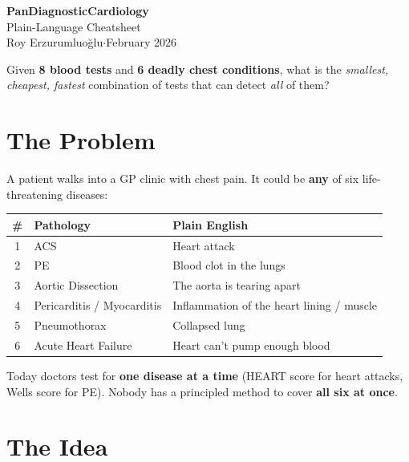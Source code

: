 \documentclass[11pt,a4paper]{article}
\begin{document}
\begin{center}
{\LARGE\bfseries\color{accent} PanDiagnosticCardiology}\\[4pt]
{\Large Plain-Language Cheatsheet}\\[6pt]
{\normalsize Roy Erzurumluo\u{g}lu\quad$\cdot$\quad February 2026}
\end{center}

\begin{tcolorbox}[insightbox, title={The Paper in One Sentence}]
Given \textbf{8 blood tests} and \textbf{6 deadly chest conditions}, what is the
\emph{smallest, cheapest, fastest} combination of tests that can detect
\emph{all} of them?
\end{tcolorbox}

\section{The Problem}

A patient walks into a GP clinic with chest pain. It could be \textbf{any} of
six life-threatening diseases:

\begin{table}[h]
\centering\small
\begin{tabular}{@{}clp{7.5cm}@{}}
\toprule
\textbf{\#} & \textbf{Pathology} & \textbf{Plain English} \\
\midrule
1 & ACS            & Heart attack \\
2 & PE             & Blood clot in the lungs \\
3 & Aortic Dissection & The aorta is tearing apart \\
4 & Pericarditis / Myocarditis & Inflammation of the heart lining / muscle \\
5 & Pneumothorax   & Collapsed lung \\
6 & Acute Heart Failure & Heart can't pump enough blood \\
\bottomrule
\end{tabular}
\end{table}

Today doctors test for \textbf{one disease at a time} (HEART score for heart
attacks, Wells score for PE). Nobody has a principled method to cover
\textbf{all six at once}.


\section{The Idea}
\end{document}

